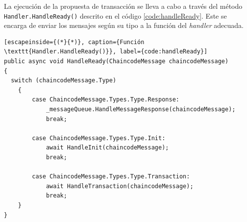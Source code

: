 %
%
%
%




La ejecución de la propuesta de transacción se lleva a cabo a través del método \texttt{Handler.HandleReady()} descrito en el código \ref{code:handleReady}. Este se encarga de enviar los mensajes según su tipo a la función del \textit{handler} adecuada.\\


\begin{lstlisting}[escapeinside={(*}{*)}, caption={Función \texttt{Handler.HandleReady()}}, label={code:handleReady}]
public async void HandleReady(ChaincodeMessage chaincodeMessage)  
{
  switch (chaincodeMessage.Type)
    {
	    case ChaincodeMessage.Types.Type.Response:
	        _messageQueue.HandleMessageResponse(chaincodeMessage);
	        break;
	
	    case ChaincodeMessage.Types.Type.Init:
	        await HandleInit(chaincodeMessage);
	        break;
	
	    case ChaincodeMessage.Types.Type.Transaction:
	        await HandleTransaction(chaincodeMessage);
	        break;
    }
}
\end{lstlisting}

